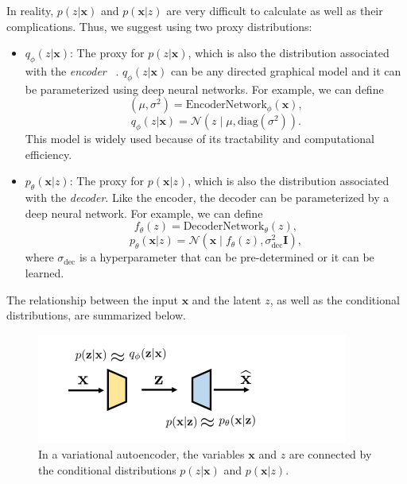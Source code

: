\vspace{10pt}
In reality, $p(z|\mathbf{x})$ and $p(\mathbf{x}|z)$ are very difficult to calculate as well as their complications. Thus, we suggest using two proxy distributions:
\begin{itemize}
    \item $q_{\phi}(z|\mathbf{x})$: The proxy for $p(z|\mathbf{x})$, which is also the distribution associated with the \textit{encoder} ~\cite{james1980monte}. 
    $q_{\phi}(z|\mathbf{x})$ can be any directed graphical model and it can be parameterized using deep neural networks. For example, we can define
    \[
    (\mu, \sigma^2) = \text{EncoderNetwork}_{\phi}(\mathbf{x}),
    \]
    \[
    q_{\phi}(z|\mathbf{x}) = \mathcal{N}(z \mid \mu, \text{diag}(\sigma^2)).
    \]
    This model is widely used because of its tractability and computational efficiency.
    
    \item $p_{\theta}(\mathbf{x}|z)$: The proxy for $p(\mathbf{x}|z)$, which is also the distribution associated with the \textit{decoder}. 
    Like the encoder, the decoder can be parameterized by a deep neural network. For example, we can define
    \[
    f_{\theta}(z) = \text{DecoderNetwork}_{\theta}(z),
    \]
    \[
    p_{\theta}(\mathbf{x}|z) = \mathcal{N}(\mathbf{x} \mid f_{\theta}(z), \sigma_{\text{dec}}^2 \mathbf{I}),
    \]
    where $\sigma_{\text{dec}}$ is a hyperparameter that can be pre-determined or it can be learned.
\end{itemize}
The relationship between the input $\mathbf{x}$ and the latent $z$, as well as the conditional distributions, are summarized below.
\begin{figure}[H]
    \centering
    \includegraphics[width=1.25\linewidth]{sec/VAE_relation.png}
    \caption{In a variational autoencoder, the variables $\mathbf{x}$ and $z$ are connected by the conditional distributions $p(z|\mathbf{x})$ and $p(\mathbf{x}|z)$.}
\end{figure}
